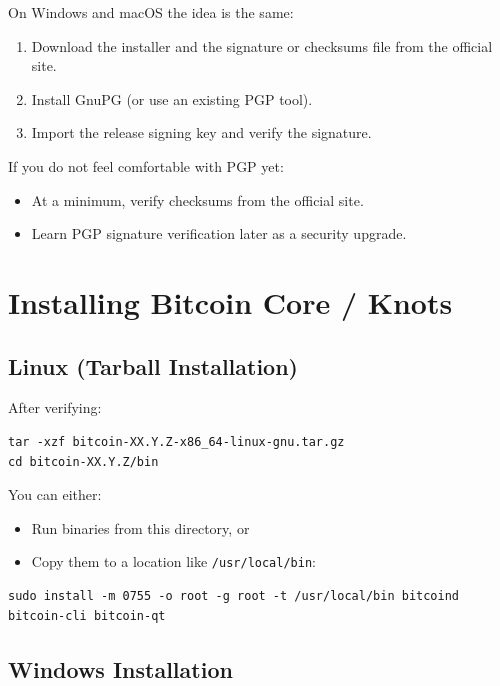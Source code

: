 \documentclass[12pt,a4paper]{book}
\begin{document}
On Windows and macOS the idea is the same:

\begin{enumerate}
  \item Download the installer and the signature or checksums file from the official site.
  \item Install GnuPG (or use an existing PGP tool).
  \item Import the release signing key and verify the signature.
\end{enumerate}

If you do not feel comfortable with PGP yet:

\begin{itemize}
  \item At a minimum, verify checksums from the official site.
  \item Learn PGP signature verification later as a security upgrade.
\end{itemize}

\chapter{Installing Bitcoin Core / Knots}

\section{Linux (Tarball Installation)}

After verifying:

\begin{lstlisting}[style=bashstyle]
tar -xzf bitcoin-XX.Y.Z-x86_64-linux-gnu.tar.gz
cd bitcoin-XX.Y.Z/bin
\end{lstlisting}

You can either:
\begin{itemize}
  \item Run binaries from this directory, or
  \item Copy them to a location like \texttt{/usr/local/bin}:
\end{itemize}

\begin{lstlisting}[style=bashstyle]
sudo install -m 0755 -o root -g root -t /usr/local/bin bitcoind bitcoin-cli bitcoin-qt
\end{lstlisting}

\section{Windows Installation}
\end{document}
